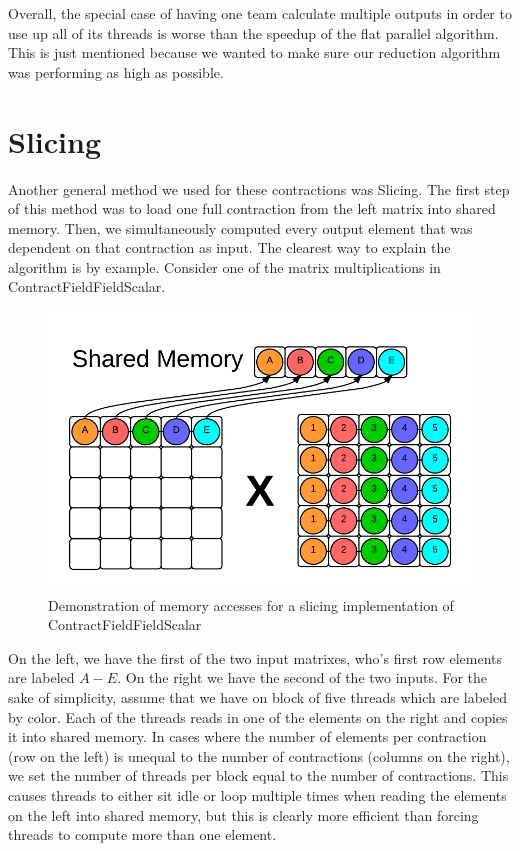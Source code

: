 Overall, the special case of having one team calculate multiple outputs in order to use up all of its threads is worse than the speedup of the flat parallel algorithm. This is just mentioned because we wanted to make sure our reduction algorithm was performing as high as possible. 

\section{Slicing}
Another general method we used for these contractions was Slicing. The first step of this method was to load one full contraction from the left matrix into shared memory. Then, we simultaneously computed every output element that was dependent on that contraction as input. The clearest way to explain the algorithm is by example. Consider one of the matrix multiplications in ContractFieldFieldScalar. 

\begin{figure}
    \centering
    \includegraphics[scale = .55]{ContractFieldFieldScalarGraphic}
    \caption{Demonstration of memory accesses for a slicing implementation of ContractFieldFieldScalar}
\end{figure}

	On the left, we have the first of the two input matrixes, who's first row elements are labeled $A-E$. On the right we have the second of the two inputs. For the sake of simplicity, assume that we have on block of five threads which are labeled by color. Each of the threads reads in one of the elements on the right and copies it into shared memory. In cases where the number of elements per contraction (row on the left) is unequal to the number of contractions (columns on the right), we set the number of threads per block equal to the number of contractions. This causes threads to either sit idle or loop multiple times when reading the elements on the left into shared memory, but this is clearly more efficient than forcing threads to compute more than one element.
	
